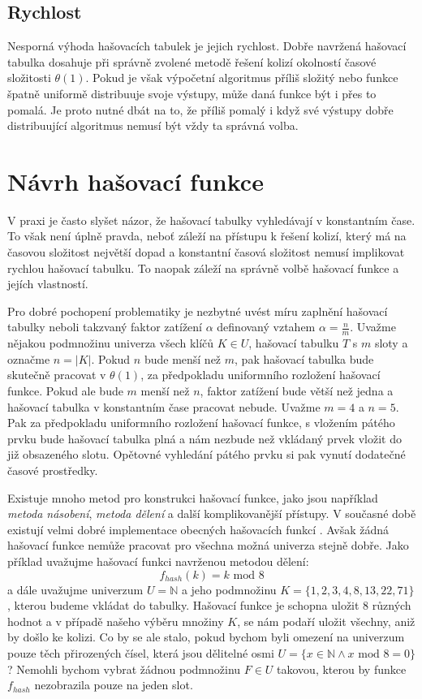 \subsection{Rychlost}

Nesporná výhoda hašovacích tabulek je jejich rychlost. Dobře navržená hašovací
tabulka dosahuje při správně zvolené metodě řešení kolizí okolností časové složitosti $\theta (1)$. Pokud je však
výpočetní algoritmus příliš složitý nebo funkce špatně uniformě distribuuje svoje výstupy, může daná
funkce být i přes to pomalá. Je proto nutné dbát na to, že příliš pomalý i když své výstupy dobře distribuující
algoritmus nemusí být vždy ta správná volba.

\section{Návrh hašovací funkce}
\label{se:hash_function_design}

V praxi je často slyšet názor, že hašovací tabulky vyhledávají v konstantním čase.
To však není úplně pravda, neboť záleží na přístupu k řešení kolizí, který má na
časovou složitost největší dopad a konstantní časová složitost nemusí implikovat
rychlou hašovací tabulku. To naopak záleží na správně volbě hašovací funkce a
jejích vlastností.

Pro dobré pochopení problematiky je nezbytné uvést míru zaplnění hašovací tabulky
neboli takzvaný faktor zatížení $\alpha$ definovaný vztahem $\alpha = \frac{n}{m}$.
Uvažme nějakou podmnožinu univerza
všech klíčů $K \in U$, hašovací tabulku $T$ s $m$ sloty a označme $n = |K|$.
Pokud $n$ bude menší než $m$, pak hašovací tabulka bude skutečně pracovat v 
$\theta (1)$, za předpokladu uniformního rozložení hašovací funkce. Pokud ale
bude $m$ menší než $n$, faktor zatížení bude větší než jedna a hašovací tabulka
v konstantním čase pracovat nebude. Uvažme $m=4$ a $n=5$. Pak za předpokladu
uniformního rozložení hašovací funkce, s vložením pátého prvku bude hašovací 
tabulka plná a nám nezbude než vkládaný prvek vložit do již obsazeného slotu.
Opětovné vyhledání pátého prvku si pak vynutí dodatečné časové prostředky.

Existuje mnoho metod pro konstrukci hašovací funkce, jako jsou například
\textit{metoda násobení}, \textit{metoda dělení} a další komplikovanější
přístupy. V současné době existují velmi dobré implementace obecných hašovacích funkcí 
\cite{murmurhash2,murmurhash3,cityhash_slides}.
Avšak žádná hašovací funkce nemůže pracovat pro všechna možná univerza stejně
dobře. Jako příklad uvažujme hašovací funkci navrženou metodou dělení:
$$ f_{hash}(k) = k \text{ mod } 8 $$ 
a dále uvažujme univerzum $U = \mathbb{N}$ a jeho
podmnožinu $K = \{1,2,3,4,8,13,22,71\}$, kterou budeme vkládat do tabulky.
Hašovací funkce je schopna uložit $8$ různých hodnot a v případě 
našeho výběru množiny $K$, se nám podaří uložit všechny, aniž by došlo ke kolizi.
Co by se ale stalo, pokud bychom byli omezení na univerzum pouze těch
přirozených čísel, která jsou dělitelné osmi $U = \{x \in \mathbb{N}
\land x \text{ mod } 8 = 0\}$? Nemohli bychom vybrat žádnou podmnožinu 
$F \in U$ takovou, kterou by funkce $f_{hash}$ nezobrazila pouze na jeden
slot.

